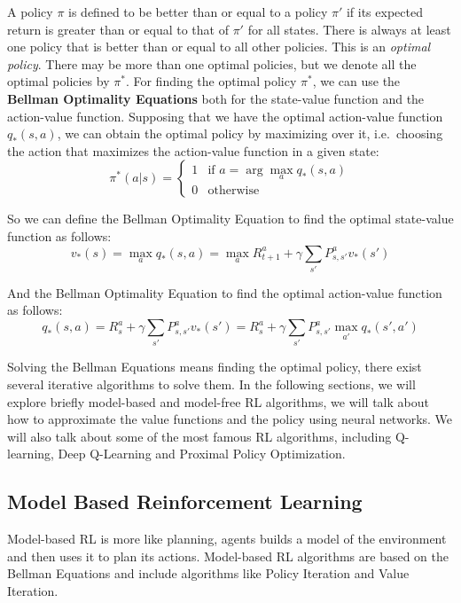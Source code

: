 A policy $\pi$ is defined to be better than or equal to a policy $\pi'$ if its expected return is greater than or equal to that of $\pi'$ for all states.
There is always at least one policy that is better than or equal to all other policies.
This is an \textit{optimal policy}.
There may be more than one optimal policies, but we denote all the optimal policies by $\pi^*$.
For finding the optimal policy $\pi^*$, we can use the \textbf{Bellman Optimality Equations} both for the state-value function and the action-value function.
Supposing that we have the optimal action-value function $q_*(s, a)$, we can obtain the optimal policy by maximizing over it, i.e.\ choosing the action that maximizes the action-value function in a given state:
\begin{equation}
    \label{eq:optimal_policy}
    \pi^*(a|s) = \begin{cases}
        1 & \text{if } a = \arg\max_{a} q_*(s, a) \\
        0 & \text{otherwise}
    \end{cases}
\end{equation}


So we can define the Bellman Optimality Equation to find the optimal state-value function as follows:
\begin{equation} \label{eq:optimal_state_value}
    v_*(s) = \max_{a} q_*(s, a) = \max_{a} R_{t+1}^a + \gamma \sum_{s'} P_{s, s'}^a v_*(s')
\end{equation}

And the Bellman Optimality Equation to find the optimal action-value function as follows:
\begin{equation} \label{eq:optimal_action_value}
    q_*(s, a) = R_s^a + \gamma \sum_{s'} P_{s, s'}^a v_*(s') = R_s^a + \gamma \sum_{s'} P_{s, s'}^a \max_{a'} q_*(s', a')
\end{equation}

Solving the Bellman Equations means finding the optimal policy, there exist several iterative algorithms to solve them.
In the following sections, we will explore briefly model-based and model-free RL algorithms, we will talk about how to approximate the value functions and the policy using neural networks.
We will also talk about some of the most famous RL algorithms, including Q-learning, Deep Q-Learning and Proximal Policy Optimization.


\subsection{Model Based Reinforcement Learning}\label{subsec:model-based-reinforcement-learning}
Model-based RL is more like planning, agents builds a model of the environment and then uses it to plan its actions.
Model-based RL algorithms are based on the Bellman Equations and include algorithms like Policy Iteration and Value Iteration.

